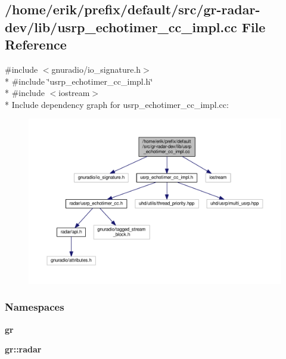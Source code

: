 \subsection{/home/erik/prefix/default/src/gr-\/radar-\/dev/lib/usrp\+\_\+echotimer\+\_\+cc\+\_\+impl.cc File Reference}
\label{usrp__echotimer__cc__impl_8cc}
{\ttfamily \#include $<$gnuradio/io\+\_\+signature.\+h$>$}\\*
{\ttfamily \#include \char`\"{}usrp\+\_\+echotimer\+\_\+cc\+\_\+impl.\+h\char`\"{}}\\*
{\ttfamily \#include $<$iostream$>$}\\*
Include dependency graph for usrp\+\_\+echotimer\+\_\+cc\+\_\+impl.\+cc\+:
\nopagebreak
\begin{figure}[H]
\begin{center}
\leavevmode
\includegraphics[width=350pt]{d9/d76/usrp__echotimer__cc__impl_8cc__incl}
\end{center}
\end{figure}
\subsubsection*{Namespaces}
\begin{DoxyCompactItemize}
\item 
 {\bf gr}
\item 
 {\bf gr\+::radar}
\end{DoxyCompactItemize}
